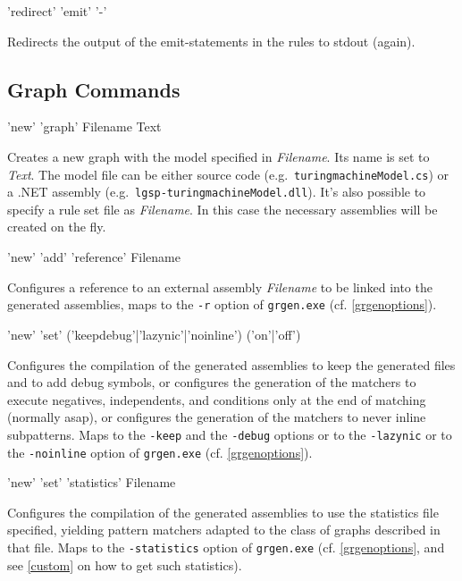 \begin{rail}
'redirect' 'emit' '-'
\end{rail}
Redirects the output of the emit-statements in the rules to stdout (again).

\subsection{Graph Commands}
\label{graphcommands}

\begin{rail}
  'new' 'graph' Filename Text
\end{rail}
Creates a new graph with the model specified in \emph{Filename}.
Its name is set to \emph{Text}.
The model file can be either source code (e.g.\ \texttt{turing\textunderscore machineModel.cs}) or a .NET assembly (e.g.\ \texttt{lgsp-turing\textunderscore machineModel.dll}).
It's also possible to specify a rule set file as \emph{Filename}.
In this case the necessary assemblies will be created on the fly.

\begin{rail}
  'new' 'add' 'reference' Filename
\end{rail}
Configures a reference to an external assembly \emph{Filename} to be linked into the generated assemblies, maps to the \texttt{-r} option of \texttt{grgen.exe} (cf. \ref{grgenoptions}).

\begin{rail}
  'new' 'set' ('keepdebug'|'lazynic'|'noinline') ('on'|'off')
\end{rail}
Configures the compilation of the generated assemblies to keep the generated files and to add debug symbols,
or configures the generation of the matchers to execute negatives, independents, and conditions only at the end of matching (normally asap),
or configures the generation of the matchers to never inline subpatterns.
Maps to the \texttt{-keep} and the \texttt{-debug} options or to the \texttt{-lazynic} or to the \texttt{-noinline} option of \texttt{grgen.exe} (cf. \ref{grgenoptions}).

\begin{rail}
  'new' 'set' 'statistics' Filename
\end{rail}
Configures the compilation of the generated assemblies to use the statistics file specified, yielding pattern matchers adapted to the class of graphs described in that file.
Maps to the \texttt{-statistics} option of \texttt{grgen.exe} (cf. \ref{grgenoptions}, and see \ref{custom} on how to get such statistics).

